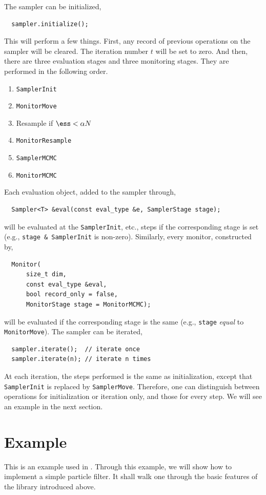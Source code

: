 The sampler can be initialized,
\begin{Verbatim}
  sampler.initialize();
\end{Verbatim}
This will perform a few things. First, any record of previous operations on the
sampler will be cleared. The iteration number $t$ will be set to zero. And
then, there are three evaluation stages and three monitoring stages. They are
performed in the following order.
\begin{enumerate}
  \item \verb|SamplerInit|
  \item \verb|MonitorMove|
  \item Resample if $\ess < \alpha N$
  \item \verb|MonitorResample|
  \item \verb|SamplerMCMC|
  \item \verb|MonitorMCMC|
\end{enumerate}
Each evaluation object, added to the sampler through,
\begin{Verbatim}
  Sampler<T> &eval(const eval_type &e, SamplerStage stage);
\end{Verbatim}
will be evaluated at the \verb|SamplerInit|, etc., steps if the corresponding
stage is set (e.g., \verb|stage & SamplerInit| is non-zero). Similarly, every
monitor, constructed by,
\begin{Verbatim}
  Monitor(
      size_t dim,
      const eval_type &eval,
      bool record_only = false,
      MonitorStage stage = MonitorMCMC);
\end{Verbatim}
will be evaluated if the corresponding stage is the same (e.g., \verb|stage|
\emph{equal} to \verb|MonitorMove|). The sampler can be iterated,
\begin{Verbatim}
  sampler.iterate();  // iterate once
  sampler.iterate(n); // iterate n times
\end{Verbatim}
At each iteration, the steps performed is the same as initialization, except
that \verb|SamplerInit| is replaced by \verb|SamplerMove|. Therefore, one can
distinguish between operations for initialization or iteration only, and those
for every step. We will see an example in the next section.

\section{Example}
\label{sec:Example (PF)}

This is an example used in \cite{Johansen:2009wd}. Through this example, we
will show how to implement a simple particle filter. It shall walk one through
the basic features of the library introduced above.

